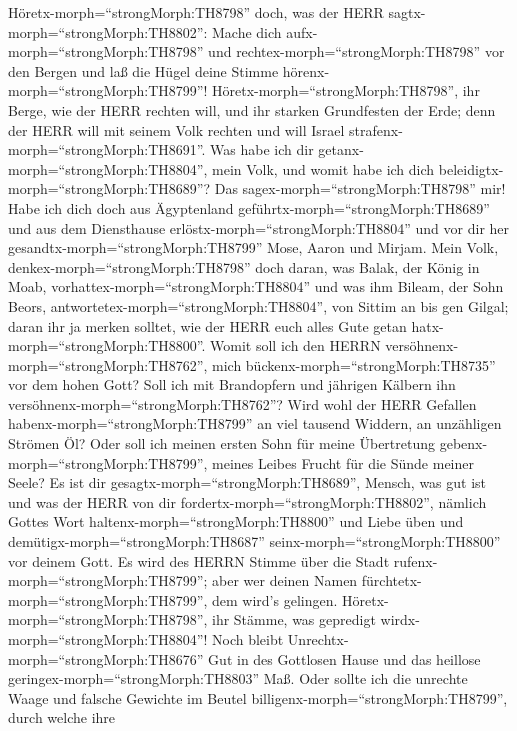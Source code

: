  Höretx-morph=``strongMorph:TH8798'' doch, was der HERR
sagtx-morph=``strongMorph:TH8802'': Mache dich
aufx-morph=``strongMorph:TH8798'' und
rechtex-morph=``strongMorph:TH8798'' vor den Bergen und laß die Hügel
deine Stimme hörenx-morph=``strongMorph:TH8799''! 
Höretx-morph=``strongMorph:TH8798'', ihr Berge, wie der HERR rechten
will, und ihr starken Grundfesten der Erde; denn der HERR will mit
seinem Volk rechten und will Israel
strafenx-morph=``strongMorph:TH8691''.  Was habe ich dir
getanx-morph=``strongMorph:TH8804'', mein Volk, und womit habe ich dich
beleidigtx-morph=``strongMorph:TH8689''? Das
sagex-morph=``strongMorph:TH8798'' mir!  Habe ich dich doch
aus Ägyptenland geführtx-morph=``strongMorph:TH8689'' und aus dem
Diensthause erlöstx-morph=``strongMorph:TH8804'' und vor dir her
gesandtx-morph=``strongMorph:TH8799'' Mose, Aaron und Mirjam.
 Mein Volk, denkex-morph=``strongMorph:TH8798'' doch daran,
was Balak, der König in Moab, vorhattex-morph=``strongMorph:TH8804'' und
was ihm Bileam, der Sohn Beors,
antwortetex-morph=``strongMorph:TH8804'', von Sittim an bis gen Gilgal;
daran ihr ja merken solltet, wie der HERR euch alles Gute getan
hatx-morph=``strongMorph:TH8800''.  Womit soll ich den HERRN
versöhnenx-morph=``strongMorph:TH8762'', mich
bückenx-morph=``strongMorph:TH8735'' vor dem hohen Gott? Soll ich mit
Brandopfern und jährigen Kälbern ihn
versöhnenx-morph=``strongMorph:TH8762''?  Wird wohl der HERR
Gefallen habenx-morph=``strongMorph:TH8799'' an viel tausend Widdern, an
unzähligen Strömen Öl? Oder soll ich meinen ersten Sohn für meine
Übertretung gebenx-morph=``strongMorph:TH8799'', meines Leibes Frucht
für die Sünde meiner Seele?  Es ist dir
gesagtx-morph=``strongMorph:TH8689'', Mensch, was gut ist und was der
HERR von dir fordertx-morph=``strongMorph:TH8802'', nämlich Gottes Wort
haltenx-morph=``strongMorph:TH8800'' und Liebe üben und
demütigx-morph=``strongMorph:TH8687'' seinx-morph=``strongMorph:TH8800''
vor deinem Gott.  Es wird des HERRN Stimme über die Stadt
rufenx-morph=``strongMorph:TH8799''; aber wer deinen Namen
fürchtetx-morph=``strongMorph:TH8799'', dem wird's gelingen.
Höretx-morph=``strongMorph:TH8798'', ihr Stämme, was gepredigt
wirdx-morph=``strongMorph:TH8804''!  Noch bleibt
Unrechtx-morph=``strongMorph:TH8676'' Gut in des Gottlosen Hause und das
heillose geringex-morph=``strongMorph:TH8803'' Maß.  Oder
sollte ich die unrechte Waage und falsche Gewichte im Beutel
billigenx-morph=``strongMorph:TH8799'',  durch welche ihre
